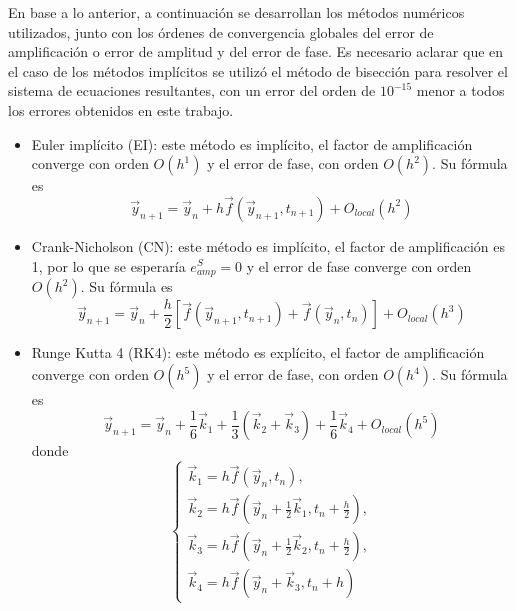 \documentclass[aps,prb,twocolumn,superscriptaddress,floatfix,longbibliography,10pt]{revtex4-2}
\newcounter{para}
\begin{document}
En base a lo anterior, a continuación se desarrollan los métodos numéricos utilizados, junto con los órdenes de convergencia globales del error de amplificación o error de amplitud y del error de fase. Es necesario aclarar que en el caso de los métodos implícitos se utilizó el método de bisección para resolver el sistema de ecuaciones resultantes, con un error del orden de $10^{-15}$ menor a todos los errores obtenidos en este trabajo.
\begin{itemize}
  \item Euler implícito (EI): este método es implícito, el factor de amplificación converge con orden $O(h^1)$ y el error de fase, con orden $O(h^2)$. Su fórmula es
  \begin{equation}
    \nonumber \vec{y}_{n+1} = \vec{y}_n + h \vec{f}(\vec{y}_{n+1}, t_{n+1}) + O_{local}(h^2)
    \label{eq:Euler_implicito}
  \end{equation}

  \item Crank-Nicholson (CN): este método es implícito, el factor de amplificación es 1, por lo que se esperaría $e^S_{amp} = 0$ y el error de fase converge con orden $O(h^2)$. Su fórmula es
  \begin{equation}
    \nonumber \vec{y}_{n+1} = \vec{y}_n + \frac{h}{2} [ \vec{f}(\vec{y}_{n+1}, t_{n+1}) + \vec{f}(\vec{y}_{n}, t_{n}) ]+ O_{local}(h^3)
    \label{eq:Crank_Nicholson}
  \end{equation}

  \item Runge Kutta 4 (RK4): este método es explícito, el factor de amplificación converge con orden $O(h^5)$ y el error de fase, con orden $O(h^4)$. Su fórmula es
  \begin{equation}
    \nonumber \vec{y}_{n+1} = \vec{y}_n + \frac{1}{6} \vec{k}_1 + \frac{1}{3} (\vec{k}_2 + \vec{k}_3) + \frac{1}{6} \vec{k}_4 + O_{local}(h^5)
    \label{eq:Runge_Kutta_4}
  \end{equation}
  donde
  \[
    \left\{\begin{matrix}
      \vec{k}_1 = h \vec{f}(\vec{y}_n, t_n), \\ 
      \vec{k}_2 = h \vec{f} \left( \vec{y}_n + \frac{1}{2} \vec{k}_1 , t_n + \frac{h}{2}\right), \\
      \vec{k}_3 = h \vec{f} \left ( \vec{y}_n + \frac{1}{2} \vec{k}_2 , t_n + \frac{h}{2}  \right ), \\
      \vec{k}_4 = h \vec{f}(\vec{y}_n + \vec{k}_3, t_n + h)
    \end{matrix}\right.
  \]


\end{itemize}
\end{document}

